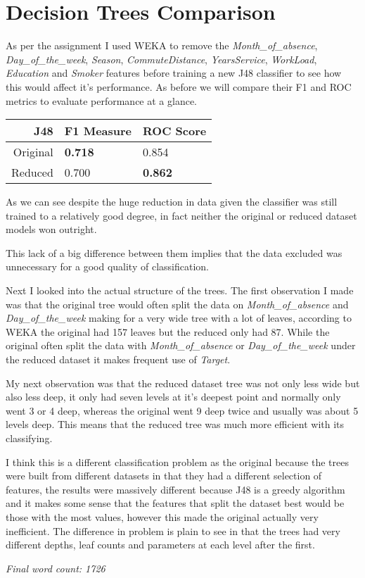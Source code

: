 \section{Decision Trees Comparison}

As per the assignment I used WEKA to remove the \textit{Month\_of\_absence}, \textit{Day\_of\_the\_week}, \textit{Season}, \textit{CommuteDistance}, \textit{YearsService}, \textit{WorkLoad}, \textit{Education} and  \textit{Smoker} features before training a new J48 classifier to see how this would affect it's performance. As before we will compare their F1 and ROC metrics to evaluate performance at a glance. 

\begin{center}
\begin{tabular}{|r|l|l|}
\hline 
J48 & F1 Measure & ROC Score \\ 
\hline 
Original & \textbf{0.718} & 0.854 \\ 
\hline 
Reduced & 0.700 & \textbf{0.862} \\ 
\hline 
\end{tabular} 
\end{center}

As we can see despite the huge reduction in data given the classifier was still trained to a relatively good degree, in fact neither the original or reduced dataset models won outright.

This lack of a big difference between them implies that the data excluded was unnecessary for a good quality of classification.

Next I looked into the actual structure of the trees. The first observation I made was that the original tree would often split the data  on \textit{Month\_of\_absence} and \textit{Day\_of\_the\_week} making for a very wide tree with a lot of leaves, according to WEKA the original had 157 leaves but the reduced only had 87. While the original often split the data with \textit{Month\_of\_absence} or \textit{Day\_of\_the\_week} under the reduced dataset it makes frequent use of \textit{Target}.

My next observation was that the reduced dataset tree was not only less wide but also less deep, it only had seven levels  at it's deepest point and normally only went 3 or 4 deep, whereas the original went 9 deep twice and usually was about 5 levels deep. This means that the reduced tree was much more efficient with its classifying.

I think this is a different classification problem as the original because the trees were built from different datasets in that they had a different selection of features, the results were massively different because J48 is a greedy algorithm and it makes some sense that the features that split the dataset best would be those with the most values, however this made the original actually very inefficient. The difference in problem is plain to see in that the trees had very different depths, leaf counts and parameters at each level after the first.

\textit{Final word count: 1726}
